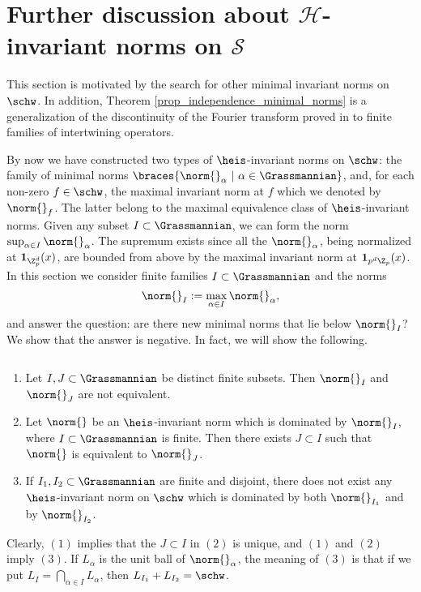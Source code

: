 \section{Further discussion about $\mathcal{H}$-invariant norms on $\mathcal{S}$}
This section is motivated by the search for other minimal invariant norms on $\schw$.
In addition, Theorem \ref{prop_independence_minimal_norms} is a generalization of the discontinuity of the Fourier transform proved in \cite{ophir2016q} to finite families of intertwining operators.

By now we have constructed two types of $\heis$-invariant norms on $\schw$: the family of minimal norms $\braces{\norm{}_\alpha\ |\ \alpha\in \Grassmannian}$, and, for each non-zero $f\in\schw$, the maximal invariant norm at $f$ which we denoted by $\norm{}_f$.
The latter belong to the maximal equivalence class of $\heis$-invariant norms.
Given any subset $I\subset \Grassmannian$, we can form the norm $\sup_{\alpha \in I}\norm{}_\alpha$.
The supremum exists since all the $\norm{}_\alpha$, being normalized at $\textbf{1}_{\Z_p^d}(x)$, are bounded from above by the maximal invariant norm at $\textbf{1}_{p^d\Z_p}(x)$.
In this section we consider finite families $I\subset \Grassmannian$ and the norms
\[\norm{}_I:=\max_{\alpha\in I}\norm{}_\alpha,\]
and answer the question: are there new minimal norms that lie below $\norm{}_I$?
We show that the answer is negative.
In fact, we will show the following.
\begin{thm}\label{thm_classification_small_norms}
$\ $
    \begin{enumerate}
    \item Let $I,J\subset \Grassmannian$ be distinct finite subsets. Then $\norm{}_I$ and $\norm{}_J$ are not equivalent.
    \item Let $\norm{}$ be an $\heis$-invariant norm which is dominated by $\norm{}_I$, where $I\subset \Grassmannian$ is finite.
    Then there exists $J\subset I$ such that $\norm{}$ is equivalent to $\norm{}_J$.
    \item If $I_1,I_2\subset \Grassmannian$ are finite and disjoint, there does not exist any $\heis$-invariant norm on $\schw$ which is dominated by both $\norm{}_{I_1}$ and by $\norm{}_{I_2}$.
    \end{enumerate}
\end{thm} 
Clearly, $(1)$ implies that the $J\subset I$ in $(2)$ is unique, and $(1)$ and $(2)$ imply $(3)$.
If $L_\alpha$ is the unit ball of $\norm{}_{\alpha}$, the meaning of $(3)$ is that if we put $L_I=\bigcap_{\alpha\in I}L_\alpha$, then $L_{I_1}+L_{I_2}=\schw$.


